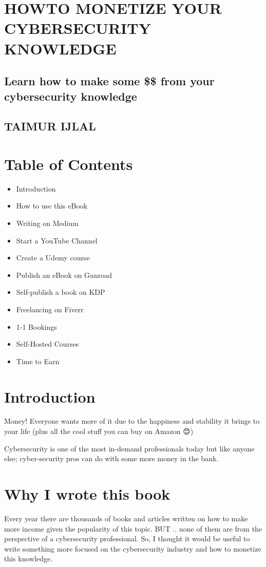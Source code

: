 \documentclass[11pt]{article}
\begin{document}
\section*{HOWTO MONETIZE YOUR CYBERSECURITY KNOWLEDGE}
\subsection*{Learn how to make some \$\$ from your cybersecurity knowledge}
\subsection*{TAIMUR IJLAL}

\section*{Table of Contents}
\begin{itemize}
\item Introduction 
\item How to use this eBook 
\item Writing on Medium 
\item Start a YouTube Channel 
\item Create a Udemy course 
\item Publish an eBook on Gunroad 
\item Self-publish a book on KDP 
\item Freelancing on Fiverr 
\item 1-1 Bookings 
\item Self-Hosted Courses 
\item Time to Earn 
\end{itemize}

\section*{Introduction}
Money! Everyone wants more of it due to the happiness and stability it brings to your life (plus all the cool stuff you can buy on Amazon 😊)

Cybersecurity is one of the most in-demand professionals today but like anyone else; cyber-security pros can do with some more money in the bank.

\section*{Why I wrote this book}
Every year there are thousands of books and articles written on how to make more income given the popularity of this topic. BUT .. none of them are from the perspective of a cybersecurity professional. So, I thought it would be useful to write something more focused on the cybersecurity industry and how to monetize this knowledge.
\end{document}
